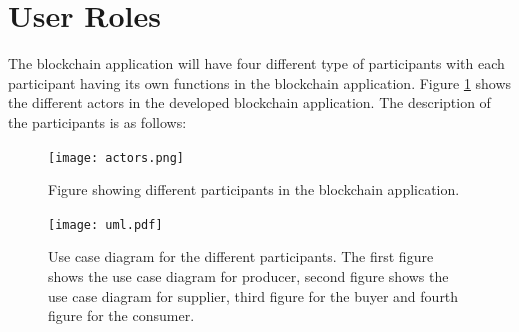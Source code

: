 \documentclass[
  a4paper,  %
  twoside,  %
  bibliography=totoc,
  headsepline,
  cleardoublepage=empty,
  parskip=half,
  draft=false
]{scrbook}
\begin{document}
\section{User Roles}
The blockchain application will have four different type of participants with each participant having its own functions in the blockchain application. Figure \ref{fig:actors} shows the different actors in the developed blockchain application. The description of the participants is as follows:
\begin{figure}[h!]
\begin{center}
\texttt{[image: actors.png]}
\caption{Figure showing different participants in the blockchain application.}
\label{fig:actors}
\end{center}
\end{figure}

\begin{figure}[b!]
\begin{center}
\texttt{[image: uml.pdf]}
\caption{Use case diagram for the different participants. The first figure shows the use case diagram for producer, second figure shows the use case diagram for supplier, third figure for the buyer and fourth figure for the consumer.}
\label{fig:uml}
\end{center}
\end{figure}
\end{document}
